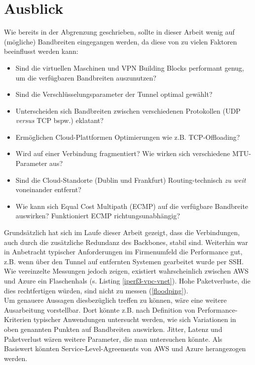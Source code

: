 \section{Ausblick}\label{ausblick}
Wie bereits in der Abgrenzung geschrieben, sollte in dieser Arbeit wenig auf (mögliche) Bandbreiten eingegangen werden, da diese von zu vielen Faktoren beeinflusst werden kann:
\begin{itemize}
    \item Sind die virtuellen Maschinen und \gls{VPN} Building Blocks performant genug, um die verfügbaren Bandbreiten auszunutzen?
    \item Sind die Verschlüsselungsparameter der Tunnel optimal gewählt?
    \item Unterscheiden sich Bandbreiten zwischen verschiedenen Protokollen (\gls{UDP} \textit{versus} \gls{TCP} bspw.) eklatant?
    \item Ermöglichen Cloud-Plattformen Optimierungen wie z.B. \gls{TCP}-Offloading?
    \item Wird auf einer Verbindung fragmentiert? Wie wirken sich verschiedene MTU-Parameter aus?
    \item Sind die Cloud-Standorte (Dublin und Frankfurt) Routing-technisch \textit{zu weit} voneinander entfernt?
    \item Wie kann sich Equal Cost Multipath (ECMP) auf die verfügbare Bandbreite auswirken? Funktioniert ECMP richtungsunabhängig?
\end{itemize}
Grundsätzlich hat sich im Laufe dieser Arbeit gezeigt, dass die Verbindungen, auch durch die zusätzliche Redundanz des Backbones, stabil sind. Weiterhin war in Anbetracht typischer Anforderungen im Firmenumfeld die Performance gut, z.B. wenn über den Tunnel auf entfernten Systemen gearbeitet wurde per \gls{SSH}. Wie vereinzelte Messungen jedoch zeigen, existiert wahrscheinlich zwischen AWS und Azure ein Flaschenhals (s. Listing \ref{iperf3-vpc-vnet}). Hohe Paketverluste, die dies rechtfertigen würden, sind nicht zu messen (\ref{floodping}).\\
Um genauere Aussagen diesbezüglich treffen zu können, wäre eine weitere Ausarbeitung vorstellbar. Dort könnte z.B. nach Definition von Performance-Kriterien typischer Anwendungen untersucht werden, wie sich Variationen in oben genannten Punkten auf Bandbreiten auswirken. Jitter, Latenz und Paketverlust wären weitere Parameter, die man untersuchen könnte. Als Basiswert könnten Service-Level-Agreements von AWS und Azure herangezogen werden.\\

